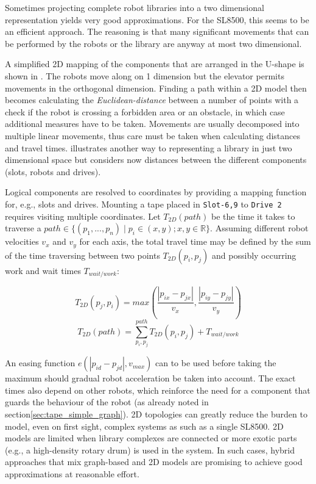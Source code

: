\documentclass{../../template/esiwace-report}
\begin{document}
Sometimes projecting complete robot libraries into a two dimensional representation yields very good approximations.
For the SL8500, this seems to be an efficient approach.
The reasoning is that many significant movements that can be performed by the robots or the library are anyway at most two dimensional.

A simplified 2D mapping of the components that are arranged in the U-shape is shown in .
The robots move along on 1 dimension but the elevator permits movements in the orthogonal dimension.
Finding a path within a 2D model then becomes calculating the \emph{Euclidean-distance} between a number of points with a check if the robot is crossing a forbidden area or an obstacle, in which case
additional measures have to be taken.
Movements are usually decomposed into multiple linear movements, thus care must be taken when calculating distances and travel times.
 illustrates another way to representing a library in just two dimensional space but considers now distances between the different components (slots, robots and drives).

Logical components are resolved to coordinates by providing a mapping function for, e.g., slots and drives.
Mounting a tape placed in \texttt{Slot-6,9} to \texttt{Drive 2} requires visiting multiple coordinates.
Let  $T_{2D}(path)$ be the time it takes to traverse a $path \in \{(p_1, ..., p_n)\;|\;p_i \in (x,y); x,y \in \mathbb{R}\}$.
Assuming different robot velocities $v_x$ and $v_y$ for each axis, the total travel time may be defined by the sum of the time traversing between two points $T_{2D}(p_i, p_j)$ and possibly occurring work and wait times $T_{wait/work}$:

\begin{equation}
T_{2D}(p_j, p_i) = max \left( \frac{|p_{ix} - p_{jx}|}{v_{x}}, \frac{|p_{iy} - p_{jy}|}{v_{y}} \right) 
\end{equation}
\begin{equation}
T_{2D}(path) = \sum^{path}_{p_{i}, p_{j}}
T_{2D}(p_i, p_j) + T_{wait/work}
\end{equation}

An easing function $e(|p_{id} - p_{jd}|, v_{max})$ can to be used before taking the maximum should gradual robot acceleration be taken into account.
The exact times also depend on other robots, which reinforce the need for a component that guards the behaviour of the robot (as already noted in section\ref{sec:tape_simple_graph}).
2D topologies can greatly reduce the burden to model, even on first sight, complex systems as such as a single SL8500.
2D models are limited when library complexes are connected or more exotic parts (e.g., a high-density rotary drum) is used in the system.
In such cases, hybrid approaches that mix graph-based and 2D models are promising to achieve good approximations at reasonable effort.
\end{document}
